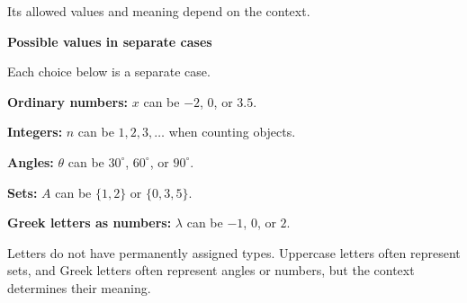 \documentclass{article}
\newcommand{\ExampleFont}{\fontsize{8.8}{10.2}\selectfont}
\begin{document}
\begin{minipage}[t]{.49\linewidth}
{Its allowed values and meaning depend on the context.\par
\vspace{1.3mm}
{\color{coral}\bfseries Possible values in separate cases}\par
{\ExampleFont Each choice below is a separate case.\par}
\vspace{0.7mm}
\textbf{Ordinary numbers:} $x$ can be $-2$, $0$, or $3.5$.\par
\vspace{0.7mm}
\textbf{Integers:} $n$ can be $1,2,3,\ldots$ when counting objects.\par
\vspace{0.7mm}
\textbf{Angles:} $\theta$ can be $30^\circ$, $60^\circ$, or $90^\circ$.\par
\vspace{0.7mm}
\textbf{Sets:} $A$ can be $\{1,2\}$ or $\{0,3,5\}$.\par
\vspace{0.7mm}
\textbf{Greek letters as numbers:} $\lambda$ can be $-1$, $0$, or $2$.\par
\vspace{1.3mm}
Letters do not have permanently assigned types. Uppercase
letters often represent sets, and Greek letters often represent
angles or numbers, but the context determines their meaning.\par
}


\end{minipage}\hfill
\end{document}
